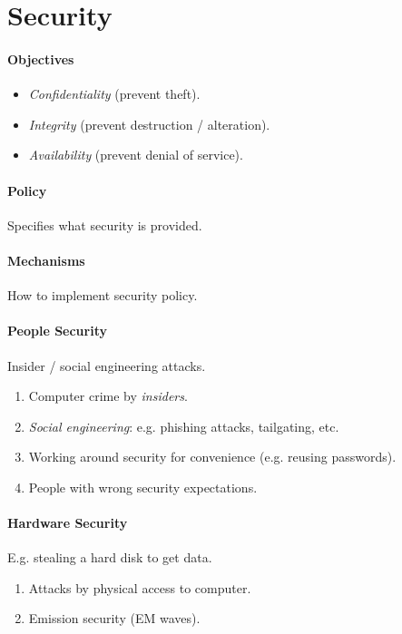 \documentclass[twocolumn,english]{article}
\begin{document}
\section{Security}

\paragraph{Objectives}
\begin{itemize}
\item \emph{Confidentiality} (prevent theft).
\item \emph{Integrity} (prevent destruction / alteration).
\item \emph{Availability} (prevent denial of service).
\end{itemize}

\paragraph{Policy}

Specifies what security is provided.

\paragraph{Mechanisms}

How to implement security policy.

\paragraph{People Security}

Insider / social engineering attacks.
\begin{enumerate}
\item Computer crime by \emph{insiders}.
\item \emph{Social engineering}: e.g. phishing attacks, tailgating, etc.
\item Working around security for convenience (e.g. reusing passwords).
\item People with wrong security expectations.
\end{enumerate}

\paragraph{Hardware Security}

E.g. stealing a hard disk to get data.
\begin{enumerate}
\item Attacks by physical access to computer.
\item Emission security (EM waves).
\end{enumerate}
\end{document}
